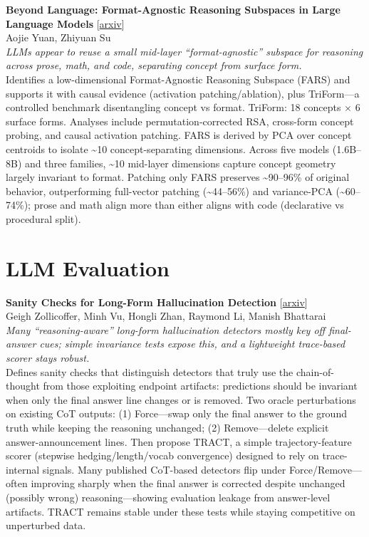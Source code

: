 \documentclass[12pt,letterpaper]{article}
\begin{document}
{\small\textbf{Beyond Language: Format-Agnostic Reasoning Subspaces in Large Language Models}} {\scriptsize[\href{https://arxiv.org/abs/2605.09496}{arxiv}]}\\
{\scriptsize Aojie Yuan, Zhiyuan Su}\\

{\small\textit{LLMs appear to reuse a small mid-layer ``format-agnostic'' subspace for reasoning across prose, math, and code, separating concept from surface form.}}\\[1pt]
{\footnotesize Identifies a low-dimensional Format-Agnostic Reasoning Subspace (FARS) and supports it with causal evidence (activation patching/ablation), plus TriForm---a controlled benchmark disentangling concept vs format. TriForm: 18 concepts × 6 surface forms. Analyses include permutation-corrected RSA, cross-form concept probing, and causal activation patching. FARS is derived by PCA over concept centroids to isolate \textasciitilde{}10 concept-separating dimensions. Across five models (1.6B--8B) and three families, \textasciitilde{}10 mid-layer dimensions capture concept geometry largely invariant to format. Patching only FARS preserves \textasciitilde{}90--96\% of original behavior, outperforming full-vector patching (\textasciitilde{}44--56\%) and variance-PCA (\textasciitilde{}60--74\%); prose and math align more than either aligns with code (declarative vs procedural split).}

\medskip


\section*{LLM Evaluation}

{\small\textbf{Sanity Checks for Long-Form Hallucination Detection}} {\scriptsize[\href{https://arxiv.org/abs/2605.08346}{arxiv}]}\\
{\scriptsize Geigh Zollicoffer, Minh Vu, Hongli Zhan, Raymond Li, Manish Bhattarai}\\

{\small\textit{Many ``reasoning-aware'' long-form hallucination detectors mostly key off final-answer cues; simple invariance tests expose this, and a lightweight trace-based scorer stays robust.}}\\[1pt]
{\footnotesize Defines sanity checks that distinguish detectors that truly use the chain-of-thought from those exploiting endpoint artifacts: predictions should be invariant when only the final answer line changes or is removed. Two oracle perturbations on existing CoT outputs: (1) Force---swap only the final answer to the ground truth while keeping the reasoning unchanged; (2) Remove---delete explicit answer-announcement lines. Then propose TRACT, a simple trajectory-feature scorer (stepwise hedging/length/vocab convergence) designed to rely on trace-internal signals. Many published CoT-based detectors flip under Force/Remove---often improving sharply when the final answer is corrected despite unchanged (possibly wrong) reasoning---showing evaluation leakage from answer-level artifacts. TRACT remains stable under these tests while staying competitive on unperturbed data.}
\end{document}
